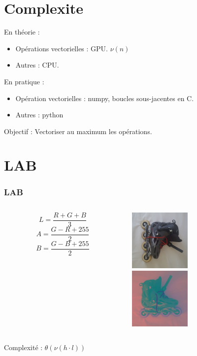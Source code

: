 \documentclass[french]{beamer}
\begin{document}
\begin{frame}
	\tableofcontents
\end{frame}

\section{Complexite}

\begin{frame}
	En théorie :
	\begin{itemize}
		\item Opérations vectorielles : GPU. \;\;\;\;\; $\nu(n)$
		\item Autres : CPU.
	\end{itemize}
	En pratique :
	\begin{itemize}
		\item Opération vectorielles : numpy, boucles sous-jacentes en C.
		\item Autres : python
	\end{itemize}
	Objectif : Vectoriser au maximum les opérations.
\end{frame}

\section{LAB}

\begin{frame}
	\frametitle{LAB}
	\begin{columns}
		\begin{column}{5cm}
			$$L = \frac{R + G + B}{3}$$
			$$A = \frac{G - R + 255}{2}$$
			$$B = \frac{G - B + 255}{2}$$
		\end{column}
		\begin{column}{5cm}
			\includegraphics[width=3cm]{images/roller.png}\\
			\includegraphics[width=3cm]{images/roller_lab.jpg}
		\end{column}
	\end{columns}
	Complexité : $\theta(\nu(h \cdot l))$
\end{frame}
\end{document}
